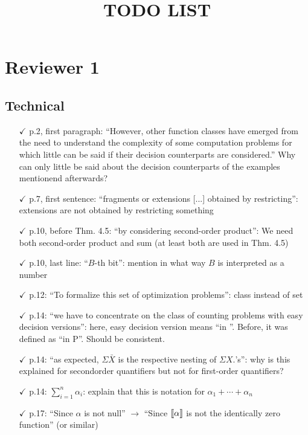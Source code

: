 \documentclass[a4paper]{article}
\begin{document}
	
\title{TODO LIST}
\date{}

\maketitle

\section*{Reviewer 1}

\subsection*{Technical}

\begin{itemize}
	\setlength\itemsep{0.5em}
\item[$\checkmark$] p.2, first paragraph: ``However, other function classes have emerged from the need to understand
the complexity of some computation problems for which little can be said if their
decision counterparts are considered.'' Why can only little be said about the decision counterparts
of the examples mentionend afterwards?
\item[$\checkmark$] p.7, first sentence: ``fragments or extensions [...] obtained by restricting'': extensions are not
obtained by restricting something
\item[$\checkmark$] p.10, before Thm. 4.5: ``by considering second-order product'': We need both second-order
product and sum (at least both are used in Thm. 4.5)
\item[$\checkmark$] p.10, last line: ``$B$-th bit'': mention in what way $B$ is interpreted as a number
\item[$\checkmark$] p.12: ``To formalize this set of optimization problems'': class instead of set
\item[$\checkmark$] p.14: ``we have to concentrate on the class of counting problems with easy decision versions'':
here, easy decision version means ``in \bpp''. Before, it was defined as ``in P''. Should be
consistent.
\item[$\checkmark$] p.14: ``as expected, $\Sigma \bar{X}$ is the respective nesting of $\Sigma X.$’s'': why is this explained for secondorder
quantifiers but not for first-order quantifiers?
\item[$\checkmark$] p.14: $\sum_{i=1}^n\alpha_i$: explain that this is notation for $\alpha_1+\cdots+\alpha_n$
\item[$\checkmark$] p.17: ``Since $\alpha$ is not null'' $\to$ ``Since ${\llbracket{}{\alpha}\rrbracket}$ is not the identically zero function'' (or similar)

\end{itemize}
\end{document}
